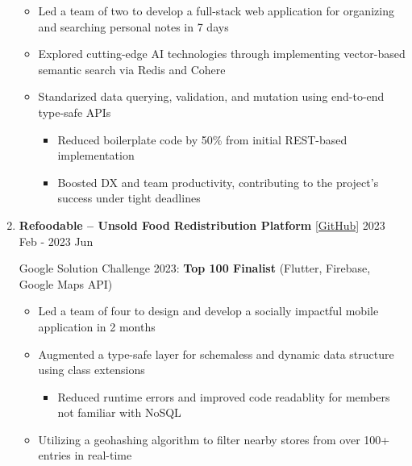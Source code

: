 \documentclass[
  a4paper,
  10pt,
  dvipdfmx
]{article}
\begin{document}
\begin{enumerate}[]
        \begin{itemize}
          \item Led a team of two to develop a full-stack web application for organizing and searching personal notes in 7 days
          \item Explored cutting-edge AI technologies through implementing vector-based semantic search via Redis and Cohere
          \item Standarized data querying, validation, and mutation using end-to-end type-safe APIs
                \begin{itemize}
                  \item Reduced boilerplate code by 50\% from initial REST-based implementation
                  \item Boosted DX and team productivity, contributing to the project's success under tight deadlines
                \end{itemize}
        \end{itemize}

  \item \textbf{Refoodable -- Unsold Food Redistribution Platform} \href{https://github.com/supawichable/ReFoodable}{[GitHub]}
        \hfill 2023 Feb - 2023 Jun

        Google Solution Challenge 2023: \textbf{Top 100 Finalist}
        (Flutter, Firebase, Google Maps API)

        \begin{itemize}
          \item Led a team of four to design and develop a socially impactful mobile application in 2 months
          \item Augmented a type-safe layer for schemaless and dynamic data structure using class extensions
                \begin{itemize}
                  \item Reduced runtime errors and improved code readablity for members not familiar with NoSQL
                \end{itemize}
          \item Utilizing a geohashing algorithm to filter nearby stores from over 100+ entries in real-time
        \end{itemize}
\end{enumerate}
\end{document}
